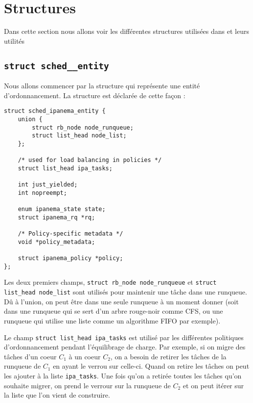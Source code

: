 \section{Structures}
Dans cette section nous allons voir les différentes structures utilisées dans \ipa et leurs utilités

\subsection{\texttt{struct sched\_\ipam\_entity}}
Nous allons commencer par la structure qui représente une entité d'ordonnancement. La structure est déclarée de cette façon :\newline
\begin{lstlisting}[style=CStyle]
struct sched_ipanema_entity {
	union {
		struct rb_node node_runqueue;
		struct list_head node_list;
	};

	/* used for load balancing in policies */
	struct list_head ipa_tasks;

	int just_yielded;
	int nopreempt;

	enum ipanema_state state;
	struct ipanema_rq *rq;

	/* Policy-specific metadata */
	void *policy_metadata;

	struct ipanema_policy *policy;
};
\end{lstlisting}

\par Les deux premiers champs, \texttt{struct rb\_node node\_runqueue} et \texttt{struct list\_head node\_list} sont utilisés pour maintenir une tâche dans une runqueue. Dû à l'union, on peut être dans une seule runqueue à un moment donner (soit dans une runqueue qui se sert d'un arbre rouge-noir comme CFS, ou une runqueue qui utilise une liste comme un algorithme FIFO par exemple).\\

\par Le champ \texttt{struct list\_head ipa\_tasks} est utilisé par les différentes politiques d'ordonnancement pendant l'équilibrage de charge. Par exemple, si on migre des tâches d'un coeur \textit{$C_1$} à un coeur \textit{$C_2$}, on a besoin de retirer les tâches de la runqueue de \textit{$C_1$} en ayant le verrou sur celle-ci. Quand on retire les tâches on peut les ajouter à la liste \texttt{ipa\_tasks}. Une fois qu'on a retirée toutes les tâches qu'on souhaite migrer, on prend le verrour sur la runqueue de \textit{$C_2$} et on peut itérer sur la liste que l'on vient de construire.\\

